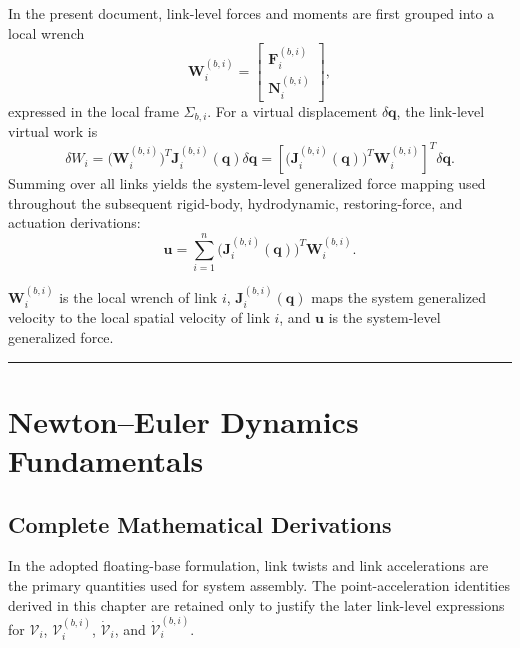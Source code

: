 \documentclass[12pt,a4paper]{report}
\newcommand{\newsymbols}[1]{\par\noindent{}#1\par\vspace{0.35em}}
\newcommand{\Frame}[1]{\Sigma_{#1}}
\begin{document}
In the present document, link-level forces and moments are first grouped into a local wrench
\begin{equation}
\mathbf{W}_i^{(b,i)}
=
\begin{bmatrix}
\mathbf{F}_i^{(b,i)} \\
\mathbf{N}_i^{(b,i)}
\end{bmatrix},
\end{equation}
expressed in the local frame $\Frame{b,i}$. For a virtual displacement $\delta\mathbf{q}$, the link-level virtual work is
\begin{equation}
\delta W_i
=
\bigl(\mathbf{W}_i^{(b,i)}\bigr)^T
\mathbf{J}_i^{(b,i)}(\mathbf{q})\delta\mathbf{q}
=
\left[
\bigl(\mathbf{J}_i^{(b,i)}(\mathbf{q})\bigr)^T
\mathbf{W}_i^{(b,i)}
\right]^T
\delta\mathbf{q}.
\end{equation}
Summing over all links yields the system-level generalized force mapping used throughout the subsequent rigid-body, hydrodynamic, restoring-force, and actuation derivations:
\begin{equation}
\mathbf{u}
=
\sum_{i=1}^{n}
\bigl(\mathbf{J}_i^{(b,i)}(\mathbf{q})\bigr)^T
\mathbf{W}_i^{(b,i)}.
\end{equation}
\newsymbols{$\mathbf{W}_i^{(b,i)}$ is the local wrench of link $i$, $\mathbf{J}_i^{(b,i)}(\mathbf{q})$ maps the system generalized velocity to the local spatial velocity of link $i$, and $\mathbf{u}$ is the system-level generalized force.}

\vspace{2em}
\hrule
\vspace{1em}


\newpage

\chapter{Newton--Euler Dynamics Fundamentals}


\section*{Complete Mathematical Derivations}

In the adopted floating-base formulation, link twists and link accelerations are the primary quantities used for system assembly. The point-acceleration identities derived in this chapter are retained only to justify the later link-level expressions for $\mathcal{V}_i$, $\mathcal{V}_i^{(b,i)}$, $\dot{\mathcal{V}}_i$, and $\dot{\mathcal{V}}_i^{(b,i)}$.
\end{document}
